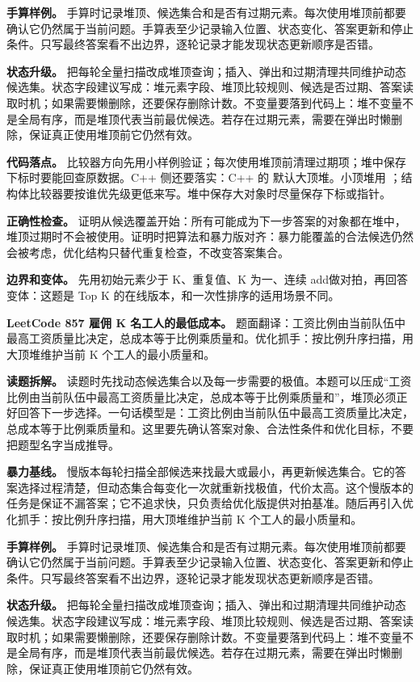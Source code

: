 \textbf{手算样例。} 手算时记录堆顶、候选集合和是否有过期元素。每次使用堆顶前都要确认它仍然属于当前问题。手算表至少记录输入位置、状态变化、答案更新和停止条件。只写最终答案看不出边界，逐轮记录才能发现状态更新顺序是否错。

\textbf{状态升级。} 把每轮全量扫描改成堆顶查询；插入、弹出和过期清理共同维护动态候选集。状态字段建议写成：堆元素字段、堆顶比较规则、候选是否过期、答案读取时机；如果需要懒删除，还要保存删除计数。不变量要落到代码上：堆不变量不是全局有序，而是堆顶代表当前最优候选。若存在过期元素，需要在弹出时懒删除，保证真正使用堆顶前它仍然有效。

\textbf{代码落点。} 比较器方向先用小样例验证；每次使用堆顶前清理过期项；堆中保存下标时要能回查原数据。C++ 侧还要落实：C++ 的  默认大顶堆。小顶堆用 ；结构体比较器要按谁优先级更低来写。堆中保存大对象时尽量保存下标或指针。

\textbf{正确性检查。} 证明从候选覆盖开始：所有可能成为下一步答案的对象都在堆中，堆顶过期时不会被使用。证明时把算法和暴力版对齐：暴力能覆盖的合法候选仍然会被考虑，优化结构只替代重复检查，不改变答案集合。

\textbf{边界和变体。} 先用初始元素少于 K、重复值、K 为一、连续 add做对拍，再回答变体：这题是 Top K 的在线版本，和一次性排序的适用场景不同。

\noindent\textbf{LeetCode 857 雇佣 K 名工人的最低成本。} 题面翻译：工资比例由当前队伍中最高工资质量比决定，总成本等于比例乘质量和。优化抓手：按比例升序扫描，用大顶堆维护当前 K 个工人的最小质量和。

\textbf{读题拆解。} 读题时先找动态候选集合以及每一步需要的极值。本题可以压成“工资比例由当前队伍中最高工资质量比决定，总成本等于比例乘质量和”，堆顶必须正好回答下一步选择。一句话模型是：工资比例由当前队伍中最高工资质量比决定，总成本等于比例乘质量和。这里要先确认答案对象、合法性条件和优化目标，不要把题型名字当成推导。

\textbf{暴力基线。} 慢版本每轮扫描全部候选来找最大或最小，再更新候选集合。它的答案选择过程清楚，但动态集合每变化一次就重新找极值，代价太高。这个慢版本的任务是保证不漏答案；它不追求快，只负责给优化版提供对拍基准。随后再引入优化抓手：按比例升序扫描，用大顶堆维护当前 K 个工人的最小质量和。

\textbf{手算样例。} 手算时记录堆顶、候选集合和是否有过期元素。每次使用堆顶前都要确认它仍然属于当前问题。手算表至少记录输入位置、状态变化、答案更新和停止条件。只写最终答案看不出边界，逐轮记录才能发现状态更新顺序是否错。

\textbf{状态升级。} 把每轮全量扫描改成堆顶查询；插入、弹出和过期清理共同维护动态候选集。状态字段建议写成：堆元素字段、堆顶比较规则、候选是否过期、答案读取时机；如果需要懒删除，还要保存删除计数。不变量要落到代码上：堆不变量不是全局有序，而是堆顶代表当前最优候选。若存在过期元素，需要在弹出时懒删除，保证真正使用堆顶前它仍然有效。

